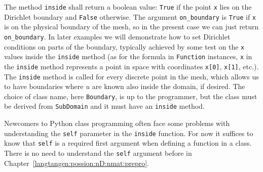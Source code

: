 \noindent
The method {\fontsize{12pt}{12pt}\verb!inside!} shall return
a boolean value: {\fontsize{12pt}{12pt}\verb!True!} if the point
{\fontsize{12pt}{12pt}\verb!x!} lies on the Dirichlet boundary and
{\fontsize{12pt}{12pt}\verb!False!} otherwise.
The argument {\fontsize{12pt}{12pt}\verb!on_boundary!} is {\fontsize{12pt}{12pt}\verb!True!} if {\fontsize{12pt}{12pt}\verb!x!} is on
the physical boundary of the mesh, so in the present case we can just return
{\fontsize{12pt}{12pt}\verb!on_boundary!}. In later examples we will demonstrate how to set
Dirichlet conditions on parts of the boundary, typically achieved by some
test on the {\fontsize{12pt}{12pt}\verb!x!} values inside the {\fontsize{12pt}{12pt}\verb!inside!} method
(as for the formula in {\fontsize{12pt}{12pt}\verb!Function!} instances, {\fontsize{12pt}{12pt}\verb!x!} in the
{\fontsize{12pt}{12pt}\verb!inside!} method represents a point in space with
coordinates {\fontsize{12pt}{12pt}\texttt{x[0]}}, {\fontsize{12pt}{12pt}\texttt{x[1]}}, etc.).
The {\fontsize{12pt}{12pt}\verb!inside!} method is called
for every discrete point in the mesh, which allows us to have boundaries
where $u$ are known also inside the domain, if desired.
The choice of class name, here {\fontsize{12pt}{12pt}\verb!Boundary!}, is up to the programmer,
but the class must be derived from {\fontsize{12pt}{12pt}\verb!SubDomain!} and it must have
an {\fontsize{12pt}{12pt}\verb!inside!} method.

Newcomers to Python class programming often face some problems with
understanding the {\fontsize{12pt}{12pt}\texttt{self}} parameter in the {\fontsize{12pt}{12pt}\texttt{inside}} function.
For now it suffices to know that {\fontsize{12pt}{12pt}\texttt{self}} is a required first argument
when defining a function in a class. There is no need to understand
the {\fontsize{12pt}{12pt}\texttt{self}} argument before in Chapter~\ref{langtangen:possion:nD:nmat:prepro}.


